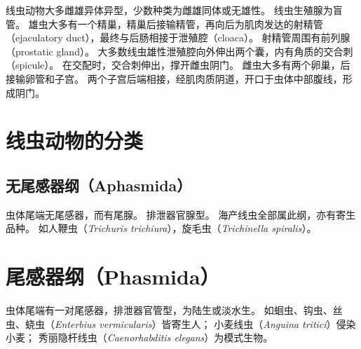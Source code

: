 \documentclass[11pt]{article}
\begin{document}
\newline

线虫动物大多雌雄异体异型，少数种类为雌雄同体或无雄性。
线虫生殖腺为盲管。
雄虫大多有一个精巢，精巢后接输精管，再向后为肌肉发达的射精管（ejaculatory duct），最终与后肠相接于泄殖腔（cloaca）。
射精管周围有前列腺（prostatic gland）。
大多数线虫雄性泄殖腔向外伸出两个囊，内有角质的交合刺（spicule）。
在交配时，交合刺伸出，撑开雌虫阴门。
雌虫大多有两个卵巢，后接输卵管和子宫。
两个子宫后端相接，经肌肉质阴道，开口于虫体中部腹线，形成阴门。
  
\section{线虫动物的分类}
\subsection{无尾感器纲（Aphasmida）}
虫体尾端无尾感器，而有尾腺。
排泄器官腺型。
海产线虫全部属此纲，亦有寄生品种。
如人鞭虫（\textit{Trichuris trichiura}），旋毛虫（\textit{Trichinella spiralis}）。

\section{尾感器纲（Phasmida）}
虫体尾端有一对尾感器，排泄器官管型，为陆生或淡水生。
如蛔虫、钩虫、丝虫、蛲虫（\textit{Enterbius vermicularis}）皆寄生人；
小麦线虫（\textit{Anguina tritici}）侵染小麦；
秀丽隐杆线虫（\textit{Caenorhabditis elegans}）为模式生物。
\end{document}
